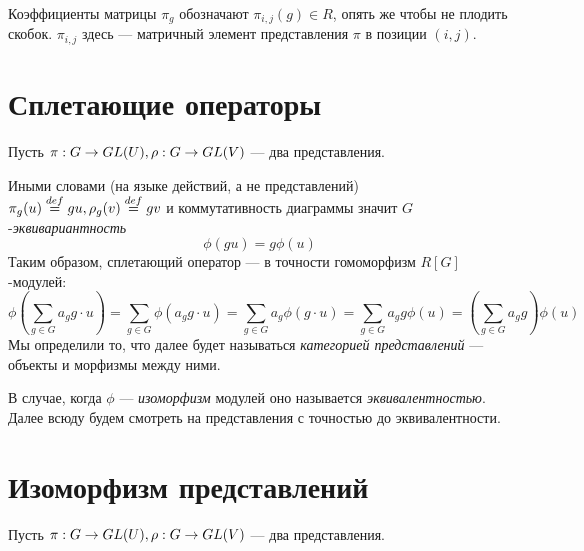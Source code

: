 Коэффициенты матрицы $\pi_g$ обозначают $\pi_{i,j}(g) \in R$, опять же чтобы не плодить скобок.
$\pi_{i,j}$ здесь --- матричный элемент представления $\pi$ в позиции $(i,j)$.


\section{Сплетающие операторы}
Пусть $\pi:G \rightarrow GL(U), \rho: G \rightarrow GL(V)$ --- два представления.

Иными словами (на языке действий, а не представлений) $\pi_g(u) \overset{def}{=} gu, \rho_g(v) \overset{def}{=} gv$ и коммутативность диаграммы значит $G$-\emph{эквивариантность}
\[\phi(gu) = g\phi(u)\]
Таким образом, сплетающий оператор --- в точности гомоморфизм $R[G]$-модулей:
\[\phi\left(\sum\limits_{g \in G}a_g g\cdot  u\right) = \sum\limits_{g \in G}\phi(a_g g \cdot u) = \sum\limits_{g \in G}a_g\phi(g \cdot u) = \sum\limits_{g \in G}a_g g \phi(u) = \left(\sum\limits_{g \in G}a_g g\right) \phi(u)\]
Мы определили то, что далее будет называться \emph{категорией представлений} --- объекты и морфизмы между ними.

В случае, когда $\phi$ --- \emph{изоморфизм} модулей оно называется \emph{эквивалентностью}.
Далее всюду будем смотреть на представления с точностью до эквивалентности.


\section{Изоморфизм представлений}
Пусть $\pi: G \rightarrow GL(U), \rho: G \rightarrow GL(V)$ --- два представления.

